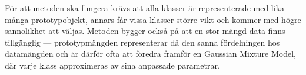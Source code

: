 \documentclass[../rapport_MVEX01-11-05]{subfiles}
\begin{document}
För att metoden ska fungera krävs att alla klasser är representerade med lika
många prototypobjekt, annars får vissa klasser större vikt och kommer med högre
sannolikhet att väljas. Metoden bygger också på att en stor mängd data finns
tillgänglig --- prototypmängden representerar då den sanna fördelningen hos datamängden
och är därför ofta att föredra framför en Gaussian Mixture Model, där varje klass
approximeras av sina anpassade parametrar.

%

\end{document}
